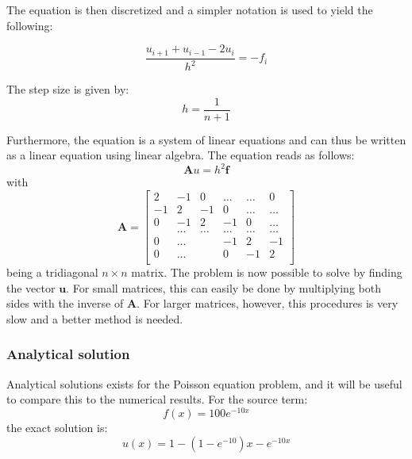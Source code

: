 \documentclass[12pt]{article}
\begin{document}
The equation is then discretized and a simpler notation is used to yield the following:

\begin{equation}
\frac{u_{i+1}+u_{i-1}-2u_{i}}{h^{2}}=-f_{i}
\end{equation}

The step size is given by:
\begin{equation}
h = \frac{1}{n+1}
\end{equation}

Furthermore, the equation is a system of linear equations and can thus be written as a linear equation using linear algebra. The equation reads as follows:
\begin{equation}
\mathbf{A}u=h^{2}\mathbf{f}
\end{equation}
with
\begin{equation}
\mathbf{A} = \begin{bmatrix}
                           2& -1& 0 &\dots   & \dots &0 \\
                           -1 & 2 & -1 &0 &\dots &\dots \\
                           0&-1 &2 & -1 & 0 & \dots \\
                           & \dots   & \dots &\dots   &\dots & \dots \\
                           0&\dots   &  &-1 &2& -1 \\
                           0&\dots    &  & 0  &-1 & 2 \\
                      \end{bmatrix}
                      \label{eq:tridiagm}
\end{equation}
being a tridiagonal  $n\times n$ matrix. The problem is now possible to solve by finding the vector $\mathbf{u}$. For small matrices, this can easily be done by multiplying both sides with the inverse of $\mathbf{A}$. For larger matrices, however, this procedures is very slow and a better method is needed. 

\subsubsection{Analytical solution}
Analytical solutions exists for the Poisson equation problem, and it will be useful to compare this to the numerical results. 
For the source term:
\begin{equation}
f(x) = 100e^{-10x}
\end{equation}
the exact solution is:
\begin{equation}
u(x) = 1-(1-e^{-10})x-e^{-10x}
\end{equation}
\end{document}
